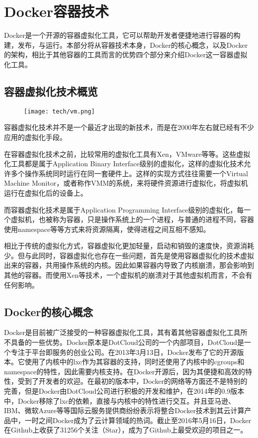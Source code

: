 \section{Docker容器技术}

Docker是一个开源的容器虚拟化工具，它可以帮助开发者便捷地进行容器的构建，发布，与运行。本部分将从容器技术本身，Docker的核心概念，以及Docker的架构，相比于其他容器的工具而言的优势四个部分来介绍Docker这一容器虚拟化工具。

\subsection{容器虚拟化技术概览}

\begin{figure}[!htp]
  \centering
  \texttt{[image: tech/vm.png]}
\end{figure}

容器虚拟化技术并不是一个最近才出现的新技术，而是在2000年左右就已经有不少应用的虚拟化手段。

在容器虚拟化技术之前，比较常用的虚拟化工具有Xen，VMware等等。这些虚拟化工具都是属于Application Binary Interface级别的虚拟化，这样的虚拟化技术允许多个操作系统同时运行在同一套硬件上。这样的实现方式往往需要一个Virtual Machine Monitor，或者称作VMM的系统，来将硬件资源进行虚拟化，将虚拟机运行在虚拟化后的设备上。

而容器虚拟化技术是属于Application Programming Interface级别的虚拟化，每一个虚拟机，也被称为容器，只是操作系统上的一个进程，与普通的进程不同，容器使用namespace等等方式来将资源隔离，使得进程之间互相不感知。\cite{soltesz2007container}

相比于传统的虚拟化方式，容器虚拟化更加轻量，启动和销毁的速度快，资源消耗少。但与此同时，容器虚拟化也存在一些问题，首先是使用容器虚拟化的技术虚拟出来的容器，共用操作系统的内核。因此如果容器内导致了内核崩溃，那会影响到其他的容器。而使用Xen等技术，一个虚拟机的崩溃对于其他虚拟机而言，不会有任何影响。\cite{dua2014virtualization}

\subsection{Docker的核心概念}

Docker是目前被广泛接受的一种容器虚拟化工具，其有着其他容器虚拟化工具所不具备的一些优势。Docker原本是DotCloud公司的一个内部项目，DotCloud是一个专注于平台即服务的创业公司。在2013年3月13日，Docker发布了它的开源版本。它使用了内核中的lxc作为其容器的支持，同时还使用了内核中的cgroups和namespace的特性，因此需要内核支持。在Docker开源后，因为其便捷和高效的特性，受到了开发者的欢迎。在最初的版本中，Docker的网络等方面还不是特别的完善，但是Docker由DotCloud公司进行积极的开发和维护，在2014年的0.9版本中，Docker移除了lxc的依赖，直接与内核中的特性进行交互。并且亚马逊、IBM、微软Azure等等国际云服务提供商纷纷表示将整合Docker技术到其云计算产品中，一时之间Docker成为了云计算领域的热词。截止至2016年5月16日，Docker在Github上收获了31256个关注（Star），成为了Github上最受欢迎的项目之一。

